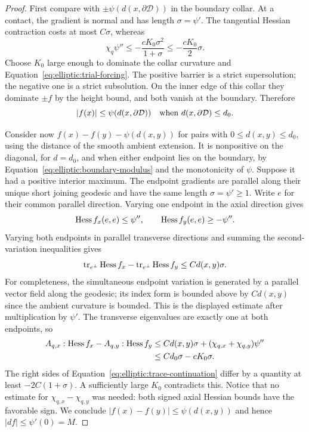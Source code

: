 \begin{proof}
First compare with $\pm\psi(d(x,\partial\mathcal D))$ in the boundary collar.
At a contact, the gradient is normal and has length $\sigma=\psi'$.
The tangential Hessian contraction costs at most $C\sigma$, whereas
\[
 \chi_q\psi''\le-\frac{cK_0\sigma^2}{1+\sigma}
                         \le-\frac{cK_0}2\sigma.
\]
Choose $K_0$ large enough to dominate the collar curvature and
Equation~\eqref{eq:elliptic:trial-forcing}.  The positive barrier is a
strict supersolution; the negative one is a strict subsolution.  On
the inner edge of this collar they dominate $\pm f$ by the height
bound, and both vanish at the boundary.  Therefore
\begin{equation}\label{eq:elliptic:boundary-modulus}
 |f(x)|\le\psi(d(x,\partial\mathcal D))
 \quad\hbox{when }d(x,\partial\mathcal D)\le d_0.
\end{equation}

Consider now $f(x)-f(y)-\psi(d(x,y))$ for pairs with
$0\le d(x,y)\le d_0$, using the distance of the smooth ambient
extension.  It is nonpositive on the diagonal, for $d=d_0$, and when
either endpoint lies on the boundary, by
Equation~\eqref{eq:elliptic:boundary-modulus} and the monotonicity of
$\psi$.  Suppose it had a positive interior maximum.  The endpoint
gradients are parallel along their unique short joining geodesic and
have the same length $\sigma=\psi'\ge1$.  Write $e$ for their common
parallel direction.  Varying one endpoint in the axial direction
gives
\[
 \operatorname{Hess} f_x(e,e)\le\psi'',\qquad
 \operatorname{Hess} f_y(e,e)\ge-\psi''.
\]
Varying both endpoints in parallel transverse directions and summing
the second-variation inequalities gives
\[
 \operatorname{tr}_{e^\perp}\operatorname{Hess} f_x-
 \operatorname{tr}_{e^\perp}\operatorname{Hess} f_y\le C d(x,y)\sigma.
\]
For completeness, the simultaneous endpoint variation is generated
by a parallel vector field along the geodesic; its index form is
bounded above by $C d(x,y)$ since the ambient curvature is bounded.
This is the displayed estimate after multiplication by $\psi'$.
The transverse eigenvalues are exactly one at both endpoints, so
\begin{align*}
 A_{q,x}:\operatorname{Hess} f_x-A_{q,y}:\operatorname{Hess} f_y
 &\le Cd(x,y)\sigma+(\chi_{q,x}+\chi_{q,y})\psi''\\
 &\le Cd_0\sigma-cK_0\sigma.
\end{align*}
The right sides of Equation~\eqref{eq:elliptic:trace-continuation}
differ by a quantity at least $-2C(1+\sigma)$.
A sufficiently large $K_0$ contradicts this.  Notice that no estimate
for $\chi_{q,x}-\chi_{q,y}$ was needed: both signed axial Hessian
bounds have the favorable sign.  We conclude
$|f(x)-f(y)|\le\psi(d(x,y))$ and hence $|df|\le\psi'(0)=M$.


\end{proof}
